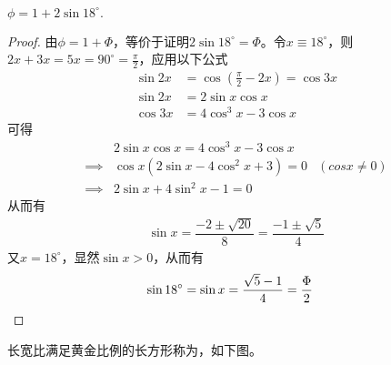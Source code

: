 \begin{example}[三角函数表示]
  $\phi=1 + 2\sin18^\circ.$
\end{example}
\begin{proof}
  由$\phi=1+\Phi$，等价于证明$2\sin18^\circ=\Phi$。令$x\equiv18^\circ$，则$2x+3x=5x=90^\circ=\frac\pi2$，应用以下公式
  \begin{align*}
    \sin 2x &= \cos \left(\frac\pi2 - 2x\right) = \cos 3x\\
    \sin 2x &=2\sin x\cos x\\
    \cos 3x &= 4\cos^3x-3\cos x
  \end{align*}
  可得
  \begin{align*}
    &2\sin x\cos x = 4\cos^3x-3\cos x\\
    \implies& \cos x(2\sin x - 4\cos^2 x + 3) = 0  & (cos x\ne 0)\\
    \implies & 2\sin x + 4\sin^2 x - 1 = 0 
  \end{align*}
  从而有
  \begin{align*}
    \sin x = \dfrac{-2\pm\sqrt{20}}{8}=\dfrac{-1\pm\sqrt5}4
  \end{align*}
又$x=18^\circ$，显然$\sin x>0$，从而有
\begin{align*}
  \sin18^\circ&=\sin x =\dfrac{\sqrt5-1}4=\dfrac\Phi2\qedhere
\end{align*}
\end{proof}

\begin{example}[黄金长方形]
  长宽比满足黄金比例的长方形称为，如下图。\par
  \begin{center}
  \end{center}
\end{example}

